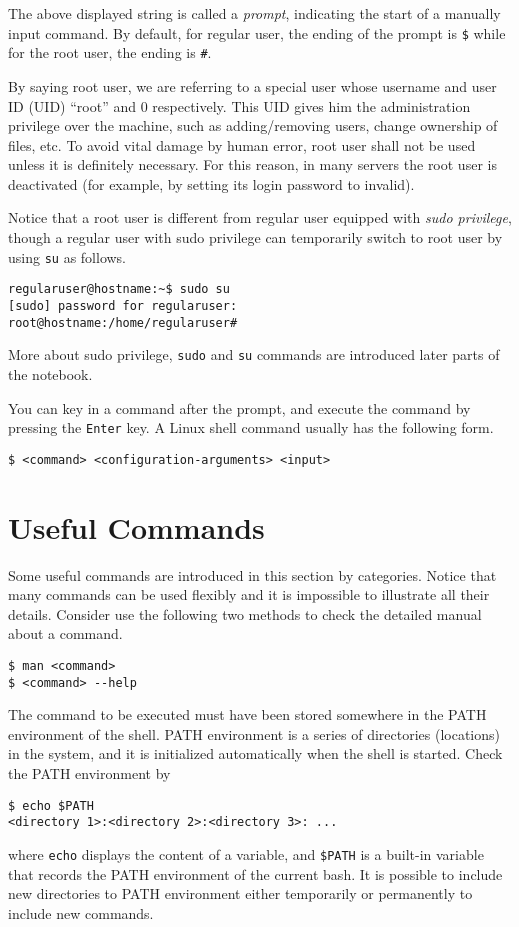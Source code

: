 The above displayed string is called a \textit{prompt}, indicating the start of a manually input command. By default, for regular user, the ending of the prompt is \verb|$| while for the root user, the ending is \verb|#|.

By saying root user, we are referring to a special user whose username and user ID (UID) ``root'' and $0$ respectively. This UID gives him the administration privilege over the machine, such as adding/removing users, change ownership of files, etc. To avoid vital damage by human error, root user shall not be used unless it is definitely necessary. For this reason, in many servers the root user is deactivated (for example, by setting its login password to invalid).

Notice that a root user is different from regular user equipped with \textit{sudo privilege}, though a regular user with sudo privilege can temporarily switch to root user by using \verb|su| as follows.
\begin{verbatim}
regularuser@hostname:~$ sudo su
[sudo] password for regularuser:
root@hostname:/home/regularuser#
\end{verbatim}

More about sudo privilege, \verb|sudo| and \verb|su| commands are introduced later parts of the notebook.

You can key in a command after the prompt, and execute the command by pressing the \verb|Enter| key. A Linux shell command usually has the following form.
\begin{verbatim}
$ <command> <configuration-arguments> <input>
\end{verbatim}

\section{Useful Commands}

Some useful commands are introduced in this section by categories. Notice that many commands can be used flexibly and it is impossible to illustrate all their details. Consider use the following two methods to check the detailed manual about a command.
\begin{verbatim}
$ man <command>
$ <command> --help
\end{verbatim}

The command to be executed must have been stored somewhere in the PATH environment of the shell. PATH environment is a series of directories (locations) in the system, and it is initialized automatically when the shell is started. Check the PATH environment by
\begin{verbatim}
$ echo $PATH
<directory 1>:<directory 2>:<directory 3>: ...
\end{verbatim}
where \verb|echo| displays the content of a variable, and \verb|$PATH| is a built-in variable that records the PATH environment of the current bash. It is possible to include new directories to PATH environment either temporarily or permanently to include new commands. 

